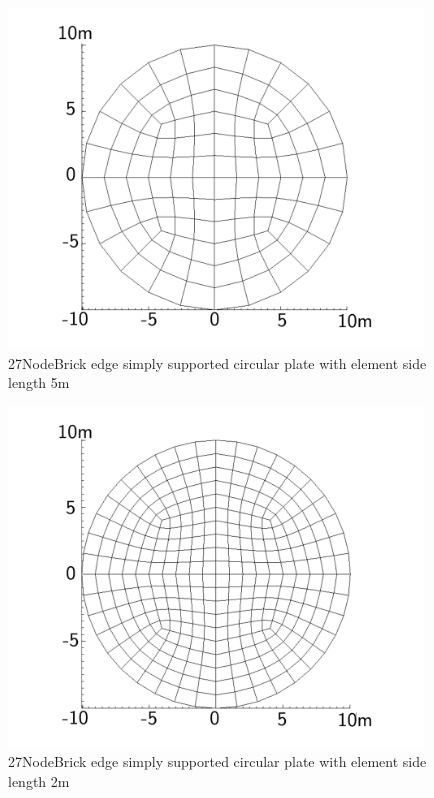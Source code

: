 \documentclass[fleqn,11pt]{article}
\begin{document}
\newpage

\begin{figure}[H]
  \centering
  \includegraphics[width=11cm]{../Figure-files/circular_plate2.pdf}
  \caption{27NodeBrick edge simply supported circular plate with element side length 5m }
  \label{fig 27NodeBrick edges simply supported circular plate with element side length 5m }
\end{figure}


\begin{figure}[H]
  \centering
  \includegraphics[width=11cm]{../Figure-files/circular_plate3.pdf}
  \caption{27NodeBrick edge simply supported circular plate with element side length 2m }
  \label{fig 27NodeBrick edges simply supported circular plate with element side length 2m }
\end{figure}

\newpage
\end{document}
